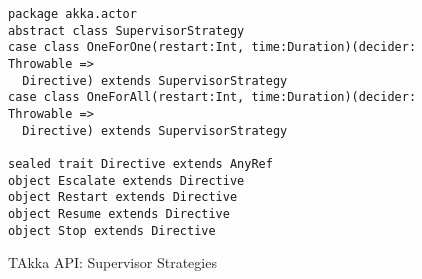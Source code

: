 \begin{figure}[h]
    \begin{lstlisting}    
package akka.actor
abstract class SupervisorStrategy
case class OneForOne(restart:Int, time:Duration)(decider: Throwable => 
  Directive) extends SupervisorStrategy
case class OneForAll(restart:Int, time:Duration)(decider: Throwable => 
  Directive) extends SupervisorStrategy

sealed trait Directive extends AnyRef
object Escalate extends Directive
object Restart extends Directive
object Resume extends Directive
object Stop extends Directive
    \end{lstlisting}
    \caption{TAkka API: Supervisor Strategies}
    \label{takka_supervisor_strategy}
\end{figure}






\begin{comment}
As shown in the API, an Akka supervisor strategy can choose different 
reactions for different reasons of child failures in its {\tt decider} 
parameter.  Recall that {\tt Throwable} is the superclass of {\tt Error} and 
{\tt Exception} in Scala and Java.  Therefore, users can pattern match on 
possible types and values of {\tt Throwable} in the {\tt decider} function.  In 
other words, when the failure of a child is passed to the {\tt decider} 
function of the supervisor, it is matched to a pattern that reacts to that 
failure.

The {\tt decider} function contains user-specified computations and returns a 
value of {\tt Directive} that denotes the standard recovery process implemented 
by the Akka library developers.  The {\tt Directive} trait is an enumerated 
type that has four possible values: the
{\tt Escalate} action which throws the exception to the supervisor of the 
supervisor, the {\tt Restart} action which replaces the failed child with a new 
one, the {\tt Resume} action which asks the child to process the message again, 
and the {\tt Stop} action which terminates the failed actor permanently.


As in OTP, for each supervisor strategy, users can specify the maximum number of
restarts of any child within a period.  The default supervisor strategy in 
TAkka is {\tt OneForOne} that permits unlimited restarts.  {\tt Directive} is 
an enumerated type with the following values: the {\tt Escalate} action which 
throws the exception to the supervisor of the supervisor, the {\tt Restart} 
action which replaces the failed child with a new one, the {\tt Resume} action 
which asks the child to process the message again, and the {\tt Stop} action 
which terminates the failed actor permanently.

\end{comment}

